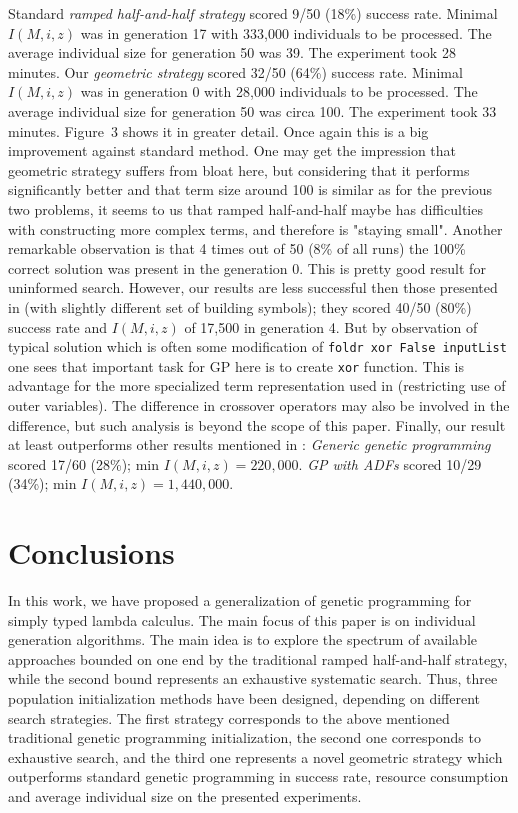 \documentclass{llncs}
\begin{document}
Standard \textit{ramped half-and-half strategy} scored 9/50 (18\%) success rate. 
Minimal $I(M,i,z)$ was in generation 17 with 333,000 individuals to be processed.
The average individual size for generation 50 was 39.
The experiment took 28 minutes.
Our \textit{geometric strategy} scored 32/50 (64\%) success rate. 
Minimal $I(M,i,z)$ was in generation 0 with 28,000 individuals to be processed.
The average individual size for generation 50 was circa 100.
The experiment took 33 minutes.
Figure~3 shows it in greater detail.
Once again this is a big improvement against standard method. 
One may get the impression that geometric strategy suffers from bloat here,
but considering that it performs significantly better and
that term size around 100 is similar as for the previous two problems, 
it seems to us that ramped half-and-half maybe has difficulties with 
constructing more complex terms, and therefore is "staying small".
Another remarkable observation is that 4 times out of 50 (8\% of all runs) 
the 100\% correct solution was present in the generation 0. This is pretty good
result for uninformed search. However, our results are less successful 
then those presented in \cite{yu01} (with slightly different set of 
building symbols); they scored 40/50 (80\%) success rate and $I(M,i,z)$ of 
17,500 in generation 4. But by observation of typical solution which is often
some modification of \texttt{foldr xor False inputList} one sees that important task
for GP here is to create \texttt{xor} function. This is advantage for the more specialized term representation used in \cite{yu01} 
(restricting use of outer variables). 
The difference in crossover operators may also be involved in the difference, 
but such analysis is beyond the scope of this paper. Finally, our result at least outperforms other results mentioned in \cite{yu01}: \textit{Generic genetic programming} 
scored 17/60 (28\%); min $I(M,i,z) = 220,000$. \textit{GP with ADFs} 
scored 10/29 (34\%); min $I(M,i,z) = 1,440,000$.


\section{Conclusions}
\label{conclusions}

In this work, we have proposed a generalization of genetic programming 
for simply typed lambda calculus. The main focus of this paper is on individual generation algorithms. 
The main idea is to explore the spectrum of available approaches bounded on one end by the traditional
ramped half-and-half strategy, while the second bound represents an exhaustive systematic search. 
Thus, three population initialization methods have been designed, 
depending on different search strategies. 
The first strategy corresponds to the above mentioned traditional genetic programming initialization,  
the second one corresponds to exhaustive search, and the third one 
represents a novel geometric strategy which outperforms standard genetic 
programming in success rate, resource consumption and average individual size 
on the presented experiments. 
\end{document}
